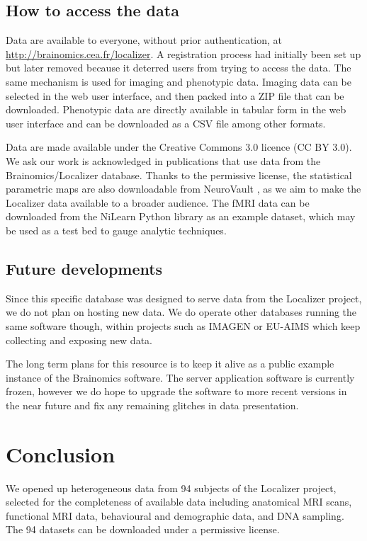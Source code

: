 \documentclass[preprint,review,12pt]{elsarticle}
\begin{document}
\subsection{How to access the data}

Data are available to everyone, without prior authentication, at \url{http://brainomics.cea.fr/localizer}. A registration process had initially been set up but later removed because it deterred users from trying to access the data. The same mechanism is used for imaging and phenotypic data. Imaging data can be selected in the web user interface, and then packed into a ZIP file that can be downloaded. Phenotypic data are directly available in tabular form in the web user interface and can be downloaded as a CSV file among other formats.

Data are made available under the Creative Commons 3.0 licence (CC BY 3.0). We ask our work is acknowledged in publications that use data from the Brainomics/Localizer database. Thanks to the permissive license, the statistical parametric maps are also downloadable from NeuroVault \cite{NeuroVault2014}, as we aim to make the Localizer data available to a broader audience.
The fMRI data can be downloaded from the NiLearn Python library \cite{NiLearn} as an example dataset, which may be used as a test bed to gauge analytic techniques.


\subsection{Future developments}

Since this specific database was designed to serve data from the Localizer project, we do not plan on hosting new data. We do operate other databases running the same software though, within projects such as IMAGEN \cite{Imagen2010} or EU-AIMS \cite{Aims2014} which keep collecting and exposing new data.

The long term plans for this resource is to keep it alive as a public example instance of the {Brainomics} software. The server application software is currently frozen, however we do hope to upgrade the software to more recent versions in the near future and fix any remaining glitches in data presentation.


\section{Conclusion}

We opened up heterogeneous data from 94 subjects of the Localizer project, selected for the completeness of available data including anatomical MRI scans, functional MRI data, behavioural and demographic data, and DNA sampling. The 94 datasets can be downloaded under a permissive license.
\end{document}
